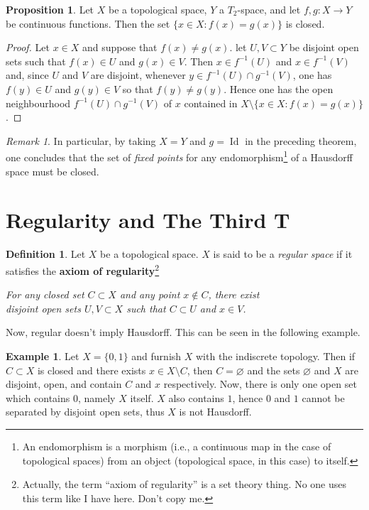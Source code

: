 \documentclass{book}
\theoremstyle{definition}
\newtheorem{proposition}{Proposition}[section]
\newtheorem{definition}{Definition}[section]
\newtheorem{example}{Example}[section]
\theoremstyle{remark}
\newtheorem{remark}{Remark}[section]
\DeclareMathOperator{\Id}{Id}
\begin{document}
\begin{proposition}
Let $X$ be a topological space, $Y$ a $T_2$-space, and let $f,g:X\to Y$ be continuous functions. Then the set $\{x\in X:f(x)=g(x)\}$ is closed.
\end{proposition}
\begin{proof}
Let $x\in X$ and suppose that $f(x)\neq g(x)$. let $U,V\subset Y$ be disjoint open sets such that $f(x)\in U$ and $g(x)\in V$. Then $x\in f^{-1}(U)$ and $x\in f^{-1}(V)$ and, since $U$ and $V$ are disjoint, whenever $y\in f^{-1}(U)\cap g^{-1}(V)$, one has $f(y)\in U$ and $g(y)\in V$ so that $f(y)\neq g(y)$. Hence one has the open neighbourhood $f^{-1}(U)\cap g^{-1}(V)$ of $x$ contained in $X\setminus\{x\in X:f(x)=g(x)\}$.
\end{proof}

\begin{remark}
In particular, by taking $X=Y$ and $g=\Id$ in the preceding theorem, one concludes that the set of \textit{fixed points} for any endomorphism\footnote{An endomorphism is a morphism (i.e., a continuous map in the case of topological spaces) from an object (topological space, in this case) to itself.} of a Hausdorff space must be closed.
\end{remark}

\section{Regularity and The Third T}
\begin{definition}
Let $X$ be a topological space. $X$ is said to be a \textit{regular space} if it satisfies the \textbf{axiom of regularity}\footnote{Actually, the term ``axiom of regularity'' is a set theory thing. No one uses this term like I have here. Don't copy me.}
\begin{center}
    \textit{For any closed set $C\subset X$ and any point $x\notin C$, there exist\\disjoint open sets $U,V\subset X$ such that $C\subset U$ and $x\in V$.}
\end{center}
\end{definition}

Now, regular doesn't imply Hausdorff. This can be seen in the following example.

\begin{example}
Let $X=\{0,1\}$ and furnish $X$ with the indiscrete topology. Then if $C\subset X$ is closed and there exists $x\in X\setminus C$, then $C=\varnothing$ and the sets $\varnothing$ and $X$ are disjoint, open, and contain $C$ and $x$ respectively. Now, there is only one open set which contains $0$, namely $X$ itself. $X$ also contains $1$, hence $0$ and $1$ cannot be separated by disjoint open sets, thus $X$ is not Hausdorff.
\end{example}
\end{document}
